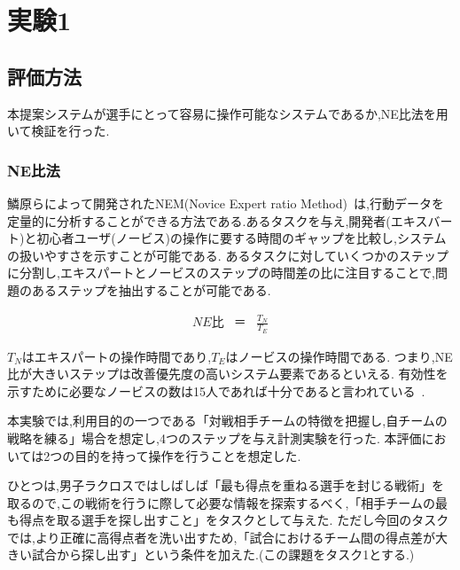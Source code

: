 \documentclass[sotsuron]{kuee}
\begin{document}
	\section{実験1}
		\subsection{評価方法}
			本提案システムが選手にとって容易に操作可能なシステムであるか,NE比法を用いて検証を行った.
				\subsubsection{NE比法}
					鱗原らによって開発されたNEM(Novice Expert ratio Method)~\cite{NEM}は,行動データを定量的に分析することができる方法である.あるタスクを与え,開発者(エキスバート)と初心者ユーザ(ノービス)の操作に要する時間のギャップを比較し,システムの扱いやすさを示すことが可能である.
					あるタスクに対していくつかのステップに分割し,エキスパートとノービスのステップの時間差の比に注目することで,問題のあるステップを抽出することが可能である.

					\begin{eqnarray}
						NE比 & ＝ & \frac{T_N}{T_E}
					\end{eqnarray}
					
					$T_N$はエキスパートの操作時間であり,$T_E$はノービスの操作時間である.
					つまり,NE比が大きいステップは改善優先度の高いシステム要素であるといえる.
					有効性を示すために必要なノービスの数は15人であれば十分であると言われている~\cite{Nielsen}.
					
					本実験では,利用目的の一つである「対戦相手チームの特徴を把握し,自チームの戦略を練る」場合を想定し,4つのステップを与え計測実験を行った.
					本評価においては2つの目的を持って操作を行うことを想定した.
					
					ひとつは,男子ラクロスではしばしば「最も得点を重ねる選手を封じる戦術」を取るので,この戦術を行うに際して必要な情報を探索するべく,「相手チームの最も得点を取る選手を探し出すこと」をタスクとして与えた.
					ただし今回のタスクでは,より正確に高得点者を洗い出すため,「試合におけるチーム間の得点差が大きい試合から探し出す」という条件を加えた.(この課題をタスク1とする.)
					
\end{document}
